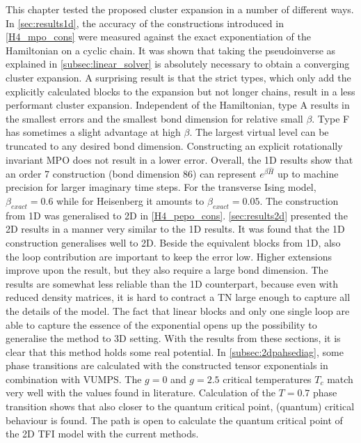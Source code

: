 This chapter tested the proposed cluster expansion in a number of different ways. In \cref{sec:results1d}, the accuracy of the constructions introduced in \cref{H4_mpo_cons} were measured against the exact exponentiation of the Hamiltonian on a cyclic chain. It was shown that taking the pseudoinverse as explained in \cref{subsec:linear_solver} is absolutely necessary to obtain a converging cluster expansion.
A surprising result is that the strict types, which only add the explicitly calculated blocks to the expansion but not longer chains, result in a less performant cluster expansion. Independent of the Hamiltonian, type A results in the smallest errors and the smallest bond dimension for relative small $\beta$. Type F has sometimes a slight advantage at high $\beta$. The largest virtual level can be truncated to any desired bond dimension. Constructing an explicit rotationally invariant \Gls{MPO} does not result in a lower error.
Overall, the 1D results show that an order 7 construction (bond dimension 86) can represent  $e^{\beta \hat{H}}$ up to machine precision for larger imaginary time steps. For the transverse Ising model, $\beta_{exact} = 0.6$ while for Heisenberg it amounts to $\beta_{exact} = 0.05$.
The construction from 1D was generalised to 2D in \cref{H4_pepo_cons}. \cref{sec:results2d} presented the 2D results in a manner very similar to the 1D results. It was found that the 1D construction generalises well to 2D. Beside the equivalent blocks from 1D, also the loop contribution are important to keep the error low. Higher extensions improve upon the result, but they also require a large bond dimension. The results are somewhat less reliable than the 1D counterpart, because even with reduced density matrices, it is hard to contract a \Gls{TN} large enough to capture all the details of the model.
The fact that linear blocks and only one single loop are able to capture the essence of the exponential opens up the possibility to generalise the method to 3D setting.
With the results from these sections, it is clear that this method holds some real potential. In \cref{subsec:2dpahsediag}, some phase transitions are calculated with the constructed tensor exponentials in combination with \Gls{VUMPS}. The $g=0$ and $g=2.5$ critical temperatures $T_c$ match very well with the values found in literature. Calculation of the $T=0.7$ phase transition shows that also closer to the quantum critical point, (quantum) critical behaviour is found. The path is open to calculate the quantum critical point of the 2D \Gls{TFI} model with the current methods.